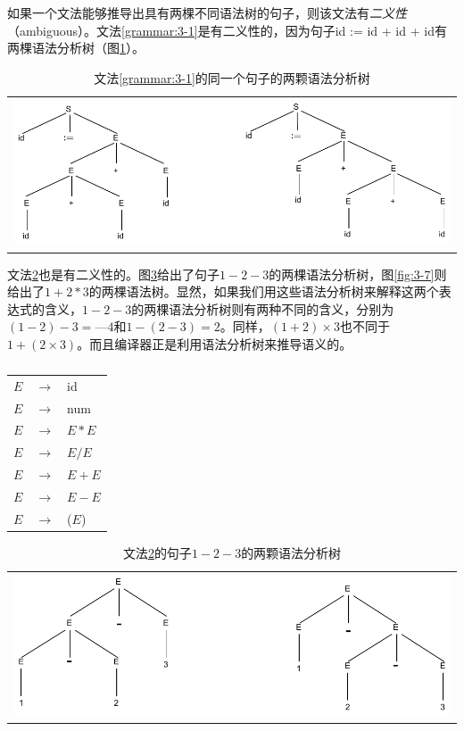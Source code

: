 \documentclass[cn,11pt,chinese]{elegantbook}
\begin{document}
如果一个文法能够推导出具有两棵不同语法树的句子，则该文法有\textit{二义性}（ambiguous）。文法\ref{grammar:3-1}是有二义性的，因为句子id := id + id + id有两棵语法分析树（图\ref{fig:3-4}）。

\renewcommand\tablename{图}
\begin{table}[htbp]
  \centering
  \begin{tabular}{l}
  \includegraphics[width=.8\textwidth]{3-4.pdf}
  \end{tabular}
  \caption{文法\ref{grammar:3-1}的同一个句子的两颗语法分析树}
  \label{fig:3-4}  
\end{table}
\renewcommand\tablename{表}

文法\ref{grammar:3-5}也是有二义性的。图\ref{fig:3-6}给出了句子$1-2-3$的两棵语法分析树，图\ref{fig:3-7}则给出了$1+2*3$的两棵语法树。显然，如果我们用这些语法分析树来解释这两个表达式的含义，$1-2-3$的两棵语法分析树则有两种不同的含义，分别为$(1-2)-3=—4$和$1-(2-3)=2$。同样，$(1+2)\times 3$也不同于$1+(2\times 3)$。而且编译器正是利用语法分析树来推导语义的。

\renewcommand\tablename{文法}
\begin{table}[htbp]
  \centering
  \begin{tabular}{lll}
    \toprule
    $E$ & $\rightarrow$ & id \\
    $E$ & $\rightarrow$ & num \\
    $E$ & $\rightarrow$ & $E*E$ \\
    $E$ & $\rightarrow$ & $E/E$ \\
    $E$ & $\rightarrow$ & $E+E$ \\
    $E$ & $\rightarrow$ & $E-E$ \\
    $E$ & $\rightarrow$ & ($E$) \\
    \bottomrule
  \end{tabular}
  \caption{}
  \label{grammar:3-5}
\end{table}
\renewcommand\tablename{表}

\renewcommand\tablename{图}
\begin{table}[htbp]
  \centering
  \begin{tabular}{l}
  \includegraphics[width=.8\textwidth]{3-6.pdf}
  \end{tabular}
  \caption{文法\ref{grammar:3-5}的句子$1-2-3$的两颗语法分析树}
  \label{fig:3-6}
\end{table}
\renewcommand\tablename{表}
\end{document}
